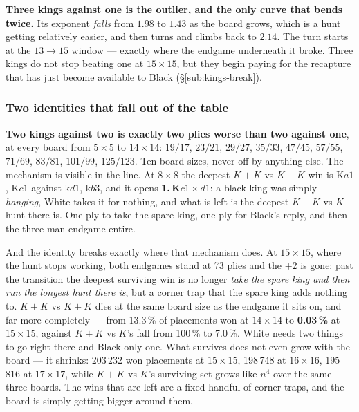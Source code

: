 \documentclass[11pt]{article}
\begin{document}
\textbf{Three kings against one is the outlier, and the only curve that bends
twice.} Its exponent \emph{falls} from $1.98$ to $1.43$ as the board grows,
which is a hunt getting relatively easier, and then turns and climbs back to
$2.14$. The turn starts at the $13 \to 15$ window --- exactly where the endgame
underneath it broke. Three kings do not stop beating one at $15\times15$, but
they begin paying for the recapture that has just become available to Black
(\S\ref{sub:kings-break}).

\subsubsection{Two identities that fall out of the table}\label{sub:kings-ident}

\noindent
\textbf{Two kings against two is exactly two plies worse than two against one},
at every board from $5\times5$ to $14\times14$: $19/17$, $23/21$, $29/27$,
$35/33$, $47/45$, $57/55$, $71/69$, $83/81$, $101/99$, $125/123$. Ten board
sizes, never off by anything else. The mechanism is visible in the line. At
$8\times8$ the deepest $K\!+\!K$ vs $K\!+\!K$ win is $\text{K}a1$, $\text{K}c1$
against $\text{k}d1$, $\text{k}b3$, and it opens
\textbf{1.\,K}$c1\!\times\!d1$: a black king was simply \emph{hanging}, White
takes it for nothing, and what is left is the deepest $K\!+\!K$ vs $K$ hunt
there is. One ply to take the spare king, one ply for Black's reply, and then
the three-man endgame entire.

And the identity breaks exactly where that mechanism does. At $15\times15$,
where the hunt stops working, both endgames stand at 73 plies and the $+2$ is
gone: past the transition the deepest surviving win is no longer \emph{take the
spare king and then run the longest hunt there is}, but a corner trap that the
spare king adds nothing to. $K\!+\!K$ vs $K\!+\!K$ dies at the same board size
as the endgame it sits on, and far more completely --- from 13.3\,\% of
placements won at $14\times14$ to \textbf{0.03\,\%} at $15\times15$, against
$K\!+\!K$ vs $K$'s fall from 100\,\% to 7.0\,\%. White needs two things to go
right there and Black only one. What survives does not even grow with the
board --- it shrinks: 203\,232 won placements at $15\times15$, 198\,748 at
$16\times16$, 195\,816 at $17\times17$, while $K\!+\!K$ vs $K$'s surviving set
grows like $n^4$ over the same three boards. The wins that are left are a fixed
handful of corner traps, and the board is simply getting bigger around them.
\end{document}
